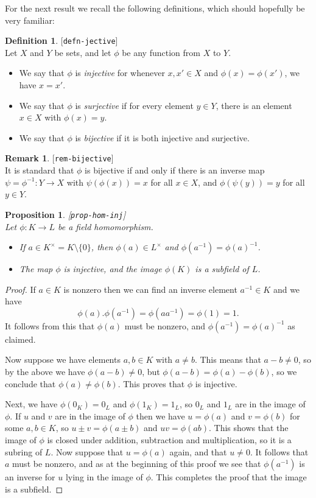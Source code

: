 \documentclass{amsart}
\newcommand{\lbl}[1]{\label{#1}\textup{[\texttt{#1}]}\ \\}
\newcommand{\lbl}{\label}
\newcommand{\sm}        {\setminus}
\newcommand{\tm}        {\times}
\renewcommand{\:}{\colon}
\newtheorem{proposition}[theorem]{Proposition}
\theoremstyle{definition}
\newtheorem{remark}[theorem]{Remark}
\newtheorem{definition}[theorem]{Definition}
\begin{document}
For the next result we recall the following definitions, which should
hopefully be very familiar:
\begin{definition}\lbl{defn-jective}
 Let $X$ and $Y$ be sets, and let $\phi$ be any function from $X$ to
 $Y$. 
 \begin{itemize}
  \item[(a)] We say that $\phi$ is \emph{injective} for whenever
   $x,x'\in X$ and $\phi(x)=\phi(x')$, we have $x=x'$.
  \item[(b)] We say that $\phi$ is \emph{surjective} if for every
   element $y\in Y$, there is an element $x\in X$ with $\phi(x)=y$.
  \item[(c)] We say that $\phi$ is \emph{bijective} if it is both
   injective and surjective.
 \end{itemize}
\end{definition}
\begin{remark}\lbl{rem-bijective}
 It is standard that $\phi$ is bijective if and only if there is an
 inverse map $\psi=\phi^{-1}\:Y\to X$ with $\psi(\phi(x))=x$ for all
 $x\in X$, and $\phi(\psi(y))=y$ for all $y\in Y$.
\end{remark}

\begin{proposition}\lbl{prop-hom-inj}
 Let $\phi\:K\to L$ be a field homomorphism.
 \begin{itemize}
  \item[(a)] If $a\in K^\tm=K\sm\{0\}$, then $\phi(a)\in L^\tm$ and
   $\phi(a^{-1})=\phi(a)^{-1}$.
  \item[(b)] The map $\phi$ is injective, and the image $\phi(K)$ is a
   subfield of $L$. 
 \end{itemize}
\end{proposition}
\begin{proof}
 If $a\in K$ is nonzero then we can find an inverse element
 $a^{-1}\in K$ and we have
 \[ \phi(a).\phi(a^{-1}) = \phi(aa^{-1}) = \phi(1) = 1. \]
 It follows from this that $\phi(a)$ must be nonzero, and
 $\phi(a^{-1})=\phi(a)^{-1}$ as claimed.  

 Now suppose we have elements $a,b\in K$ with $a\neq b$.  This means
 that $a-b\neq 0$, so by the above we have $\phi(a-b)\neq 0$, but
 $\phi(a-b)=\phi(a)-\phi(b)$, so we conclude that
 $\phi(a)\neq\phi(b)$.  This proves that $\phi$ is injective.

 Next, we have $\phi(0_K)=0_L$ and $\phi(1_K)=1_L$, so $0_L$ and $1_L$
 are in the image of $\phi$.  If $u$ and $v$ are in the image of
 $\phi$ then we have $u=\phi(a)$ and $v=\phi(b)$ for some $a,b\in K$,
 so $u\pm v=\phi(a\pm b)$ and $uv=\phi(ab)$.  This shows that the
 image of $\phi$ is closed under addition, subtraction and
 multiplication, so it is a subring of $L$.  Now suppose that
 $u=\phi(a)$ again, and that $u\neq 0$.  It follows that $a$ must be
 nonzero, and as at the beginning of this proof we see that
 $\phi(a^{-1})$ is an inverse for $u$ lying in the image of $\phi$.
 This completes the proof that the image is a subfield.
\end{proof}
\end{document}
